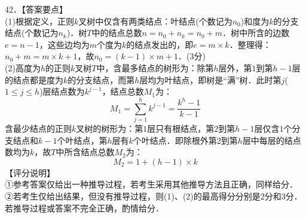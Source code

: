 42．【答案要点】 \\
(1)根据定义，正则$k$叉树中仅含有两类结点：叶结点(个数记为$n_0$)和度为$k$的分支结点(个数记为$n_k$)．树$T$中的结点总数$n=n_0+n_k=n_0+m$．树中所含的边数$e=n-1$，这些边均为$m$个度为$k$的结点发出的，即$e=m\times k$．整理得：$n_0+m=m\times k+1$，故$n_0=(k-1)\times m+1$．(3分) \\
(2)高度为$h$的正则$k$叉树$T$中，含最多结点的树形为：除第$h$层外，第$1$到第$h-1$层的结点都是度为$k$的分支结点，而第$h$层均为叶结点，即树是“满”树．此时第$j$($1\leqslant j\leqslant h$)层结点数为$k^{j-1}$，结点总数$M_1$为：
\begin{equation}
M_1=\sum_{j=1}^{h}k^{j-1}=\frac{k^h-1}{k-1}
\end{equation}
含最少结点的正则$k$叉树的树形为：第$1$层只有根结点，第$2$到第$h-1$层仅含$1$个分支结点和$k-1$个叶结点，第$h$层有$k$个叶结点．即除根外第$2$到第$h$层中每层的结点数均为$k$，故$T$中所含结点总数$M_2$为： \\
\begin{equation}
M_2=1+(h-1)\times k
\end{equation}
【评分说明】 \\
①参考答案仅给出一种推导过程，若考生采用其他推导方法且正确，同样给分． \\
②若考生仅给出结果，但没有推导过程，则(1)、(2)的最高得分分别是2分和3分．若推导过程或答案不完全正确，酌情给分．

